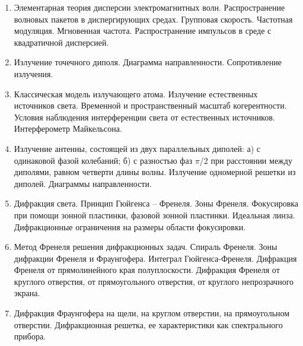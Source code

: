 \documentclass{article}
\newcounter{ticket}[subsection]
\newcounter{Ticket}[subsection]
\newcommand{\Ticket}[1][]{\item[Билет \ifthenelse{\equal{#1}{}}{}{\setcounter{ticket}{#1}}\theticket\refstepcounter{ticket}:]}
\begin{document}
\begin{enumerate}
    \Ticket Элементарная теория дисперсии электромагнитных волн. Распространение волновых пакетов в диспергирующих средах. Групповая скорость. Частотная модуляция. Мгновенная частота. Распространение импульсов в среде с квадратичной дисперсией. 
    \Ticket Излучение точечного диполя. Диаграмма направленности. Сопротивление излучения. 
    \Ticket Классическая модель излучающего атома. Излучение естественных источников света. Временной и пространственный масштаб когерентности. Условия наблюдения интерференции света от естественных источников. Интерферометр Майкельсона. 
    \Ticket Излучение антенны, состоящей из двух параллельных диполей: а) с одинаковой фазой колебаний; б) с разностью фаз $\pi$/2 при расстоянии между диполями, равном четверти длины волны. Излучение одномерной решетки из диполей. Диаграммы направленности.
    \Ticket Дифракция света. Принцип Гюйгенса – Френеля. Зоны Френеля. Фокусировка при помощи зонной пластинки, фазовой зонной пластинки. Идеальная линза. Дифракционные ограничения на размеры области фокусировки.
    \Ticket Метод Френеля решения дифракционных задач. Спираль Френеля. Зоны дифракции Френеля и Фраунгофера. Интеграл Гюйгенса-Френеля. Дифракция Френеля от прямолинейного края полуплоскости. Дифракция Френеля от круглого отверстия, от прямоугольного отверстия, от круглого непрозрачного экрана.
    \Ticket Дифракция Фраунгофера на щели, на круглом отверстии, на прямоугольном отверстии. Дифракционная решетка, ее характеристики как спектрального прибора.
\end{enumerate}
\end{document}
